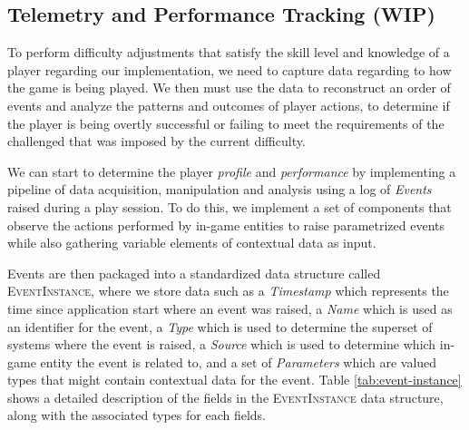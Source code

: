 




\subsection{Telemetry and Performance Tracking (WIP)}

To perform difficulty adjustments that satisfy the skill level and knowledge of a player regarding our implementation, we need to capture data regarding to how the game is being played. We then must use the data to reconstruct an order of events and analyze the patterns and outcomes of player actions, to determine if the player is being overtly successful or failing to meet the requirements of the challenged that was imposed by the current difficulty.

We can start to determine the player \emph{profile} and \emph{performance} by implementing a pipeline of data acquisition, manipulation and analysis using a log of \emph{Events} raised during a play session. To do this, we implement a set of components that observe the actions performed by in-game entities to raise parametrized events while also gathering variable elements of contextual data as input.

Events are then packaged into a standardized data structure called \textsc{EventInstance}, where we store data such as a \emph{Timestamp} which represents the time since application start where an event was raised, a \emph{Name} which is used as an identifier for the event, a \emph{Type} which is used to determine the superset of systems where the event is raised, a \emph{Source} which is used to determine which in-game entity the event is related to, and a set of \emph{Parameters} which are valued types that might contain contextual data for the event. Table \ref{tab:event-instance} shows a detailed description of the fields in the \textsc{EventInstance} data structure, along with the associated types for each fields.

